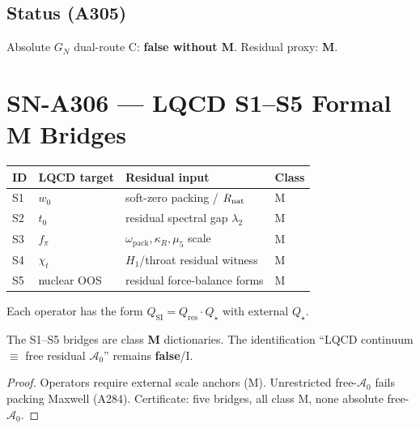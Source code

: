 \subsection*{Status (A305)}
Absolute $G_N$ dual-route C: \textbf{false without M}. Residual proxy: \textbf{M}.

\section{SN-A306 --- LQCD S1--S5 Formal M Bridges}
\label{sec:SN-A306}

\begin{definition}
\label{def:A306-S}
\begin{center}
\begin{tabular}{@{}llp{4.5cm}l@{}}
\toprule
ID & LQCD target & Residual input & Class \\
\midrule
S1 & $w_0$ & soft-zero packing / $R_{\rm nat}$ & M \\
S2 & $t_0$ & residual spectral gap $\lambda_2$ & M \\
S3 & $f_\pi$ & $\omega_{\mathrm{pack}},\kappa_R,\mu_5$ scale & M \\
S4 & $\chi_t$ & $H_1$/throat residual witness & M \\
S5 & nuclear OOS & residual force-balance forms & M \\
\bottomrule
\end{tabular}
\end{center}
Each operator has the form $Q_{\mathrm{SI}}=Q_{\mathrm{res}}\cdot Q_\star$ with external $Q_\star$.
\end{definition}

\begin{theorem}
\label{thm:A306}
The S1--S5 bridges are class \textbf{M} dictionaries. The identification
``LQCD continuum $\equiv$ free residual $\mathcal{A}_0$'' remains \textbf{false}/I.
\end{theorem}

\begin{proof}
Operators require external scale anchors (M). Unrestricted free-$\mathcal{A}_0$ fails packing Maxwell (A284).
Certificate: five bridges, all class M, none absolute free-$\mathcal{A}_0$.
\end{proof}

